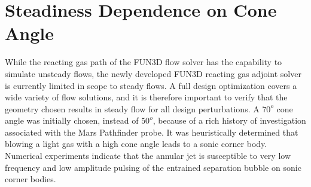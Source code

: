\section{Steadiness Dependence on Cone Angle}

While the reacting gas path of the FUN3D flow solver has the capability to
simulate unsteady flows, the newly developed FUN3D reacting gas adjoint solver
is currently limited in scope to steady flows.  A full design optimization
covers a wide variety of flow solutions, and it is therefore important to verify
that the geometry chosen results in steady flow for all design perturbations.
A $70^o$ cone angle was initially chosen, instead of $50^o$, because of a rich
history of investigation associated with the Mars Pathfinder
probe\cite{gnoffo1996influence}.  It was heuristically determined that blowing a
light gas with a high cone angle leads to a sonic corner body.  Numerical
experiments indicate that the annular jet is susceptible to very low frequency
and low amplitude pulsing of the entrained separation bubble on sonic corner
bodies.
